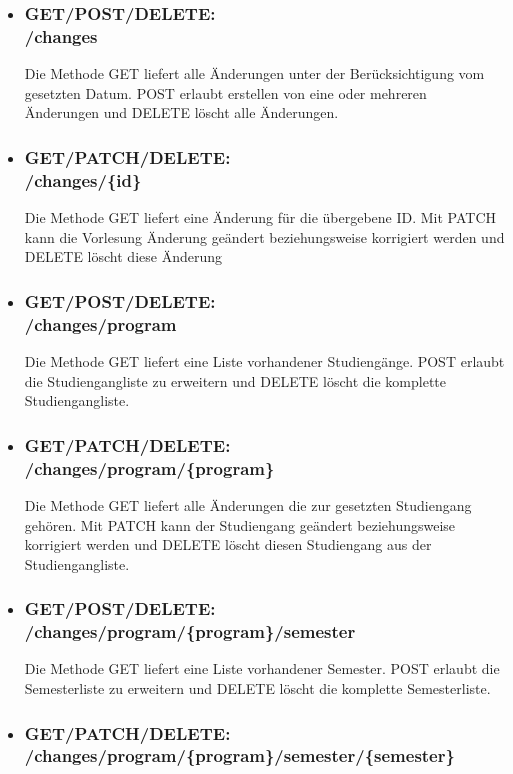 \begin{itemize}
\item \subsubsection{GET/POST/DELETE:\\ /changes}
Die Methode GET liefert alle Änderungen unter der Berücksichtigung vom gesetzten Datum. POST erlaubt erstellen von eine oder mehreren Änderungen und DELETE löscht alle Änderungen.
\item \subsubsection{GET/PATCH/DELETE:\\ /changes/\{id\}} 
Die Methode GET liefert eine Änderung für die übergebene \ac{ID}. Mit PATCH kann die Vorlesung Änderung geändert beziehungsweise korrigiert werden und DELETE löscht diese Änderung
\item \subsubsection{GET/POST/DELETE:\\ /changes/program} 
Die Methode GET liefert eine Liste vorhandener Studiengänge. POST erlaubt die Studiengangliste zu erweitern und DELETE löscht die komplette Studiengangliste.
\item \subsubsection{GET/PATCH/DELETE:\\ /changes/program/\{program\}} 
Die Methode GET liefert alle Änderungen die zur gesetzten Studiengang gehören. Mit PATCH kann der Studiengang geändert beziehungsweise korrigiert werden und DELETE löscht diesen Studiengang aus der Studiengangliste.
\item \subsubsection{GET/POST/DELETE:\\ /changes/program/\{program\}/semester} 
Die Methode GET liefert eine Liste vorhandener Semester. POST erlaubt die Semesterliste zu erweitern und DELETE löscht die komplette Semesterliste.
\item \subsubsection{GET/PATCH/DELETE:\\ /changes/program/\{program\}/semester/\{semester\}} 

\end{itemize}
